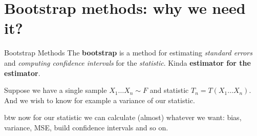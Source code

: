 \documentclass{beamer}          %
\begin{document}





\section{Bootstrap methods: why we need it?}

\begin{frame}{Bootstrap Methods}
  The \textbf{bootstrap} is a method for estimating \textit{standard errors} and \textit{computing
  confidence intervals} for the \textit{statistic}. Kinda \textbf{estimator for the estimator}.\\

  \vspace{0.4em}

  Suppose we have a single sample $X_1 \hdots X_n \sim F$ and statistic $T_n = T(X_1 \hdots X_n)$.
  And we wish to know for example a variance of our statistic.

  \vspace{0.4em}

  \begin{center}
  \end{center}

  \footnotesize
  \begin{exampleblock}{btw}
    now for our statistic we can calculate (almost) whatever we want:
    bias, variance, MSE, build confidence intervals and so on.
  \end{exampleblock}

\end{frame}
\end{document}

